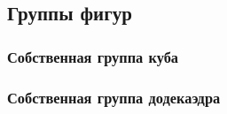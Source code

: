 \subsection{Группы фигур}
\subsubsection{Собственная группа куба}
\subsubsection{Собственная группа додекаэдра}
